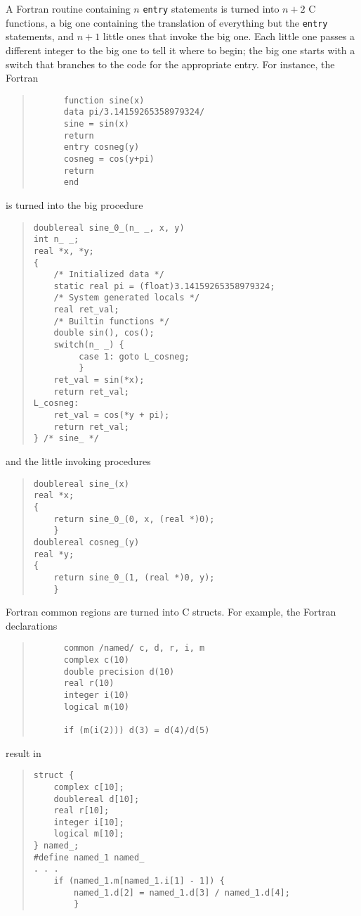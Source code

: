 \documentclass[10pt,a4paper]{article}
\begin{document}
A Fortran routine containing $n$ \verb|entry| statements is turned into $n + 2$ C functions, a big one containing the translation of everything but the \verb|entry| statements, and $n + 1$ little ones that invoke the big one. Each little one passes a different integer to the big one to tell it where to begin; the big one starts with a switch that branches to the code for the appropriate entry. For instance, the Fortran
\begin{quote}
\begin{verbatim}
      function sine(x)
      data pi/3.14159265358979324/
      sine = sin(x)
      return
      entry cosneg(y)
      cosneg = cos(y+pi)
      return
      end
\end{verbatim}
\end{quote}
is turned into the big procedure
\begin{quote}
\begin{verbatim}
doublereal sine_0_(n_ _, x, y)
int n_ _;
real *x, *y;
{
    /* Initialized data */
    static real pi = (float)3.14159265358979324;
    /* System generated locals */
    real ret_val;
    /* Builtin functions */
    double sin(), cos();
    switch(n_ _) {
         case 1: goto L_cosneg;
         }
    ret_val = sin(*x);
    return ret_val;
L_cosneg:
    ret_val = cos(*y + pi);
    return ret_val;
} /* sine_ */
\end{verbatim}
\end{quote}
and the little invoking procedures
\begin{quote}
\begin{verbatim}
doublereal sine_(x)
real *x;
{
    return sine_0_(0, x, (real *)0);
    }
doublereal cosneg_(y)
real *y;
{
    return sine_0_(1, (real *)0, y);
    }
\end{verbatim}
\end{quote}
Fortran common regions are turned into C structs. For example, the Fortran declarations
\begin{quote}
\begin{verbatim}
      common /named/ c, d, r, i, m
      complex c(10)
      double precision d(10)
      real r(10)
      integer i(10)
      logical m(10)

      if (m(i(2))) d(3) = d(4)/d(5)
\end{verbatim}
\end{quote}
result in
\begin{quote}
\begin{verbatim}
struct {
    complex c[10];
    doublereal d[10];
    real r[10];
    integer i[10];
    logical m[10];
} named_;
#define named_1 named_
. . .
    if (named_1.m[named_1.i[1] - 1]) {
        named_1.d[2] = named_1.d[3] / named_1.d[4];
        }
\end{verbatim}
\end{quote}
\end{document}
